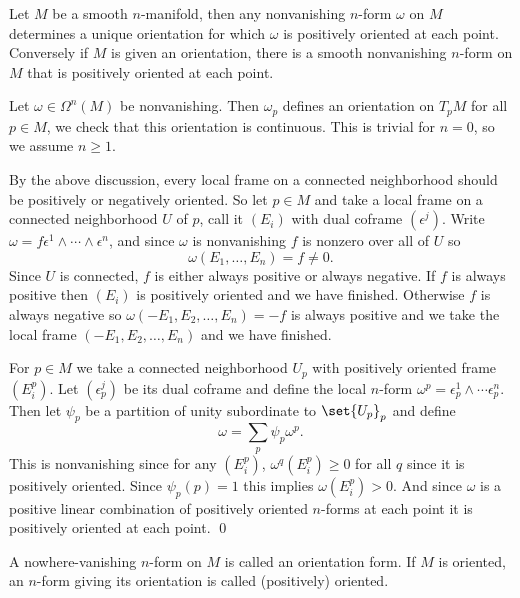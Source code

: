 \bprop

    Let $M$ be a smooth $n$-manifold, then any nonvanishing $n$-form $\omega$ on $M$ determines a unique orientation for
    which $\omega$ is positively oriented at each point.
    Conversely if $M$ is given an orientation, there is a smooth nonvanishing $n$-form on $M$ that is positively oriented
    at each point.

\eprop

\bproof

    Let $\omega\in\Omega^n(M)$ be nonvanishing.
    Then $\omega_p$ defines an orientation on $T_pM$ for all $p\in M$, we check that this orientation is continuous.
    This is trivial for $n=0$, so we assume $n\geq1$.

    By the above discussion, every local frame on a connected neighborhood should be positively or negatively oriented.
    So let $p\in M$ and take a local frame on a connected neighborhood $U$ of $p$, call it $(E_i)$ with dual coframe
    $(\epsilon^j)$.
    Write $\omega=f\epsilon^1\wedge\cdots\wedge\epsilon^n$, and since $\omega$ is nonvanishing $f$ is nonzero over all of $U$
    so
    $$ \omega(E_1,\dots,E_n) = f \neq 0 . $$
    Since $U$ is connected, $f$ is either always positive or always negative.
    If $f$ is always positive then $(E_i)$ is positively oriented and we have finished.
    Otherwise $f$ is always negative so $\omega(-E_1,E_2,\dots,E_n)=-f$ is always positive and we take the local frame
    $(-E_1,E_2,\dots,E_n)$ and we have finished.

    For $p\in M$ we take a connected neighborhood $U_p$ with positively oriented frame $(E_i^p)$.
    Let $(\epsilon^j_p)$ be its dual coframe and define the local $n$-form $\omega^p=\epsilon^1_p\wedge\cdots\epsilon^n_p$.
    Then let $\psi_p$ be a partition of unity subordinate to $\set{U_p}_p$ and define
    $$ \omega = \sum_p\psi_p\omega^p . $$
    This is nonvanishing since for any $(E_i^p)$, $\omega^q(E_i^p)\geq0$ for all $q$ since it is positively oriented.
    Since $\psi_p(p)=1$ this implies $\omega(E_i^p)>0$.
    And since $\omega$ is a positive linear combination of positively oriented $n$-forms at each point it is positively
    oriented at each point.
    \qed

\eproof

\bdefn

    A nowhere-vanishing $n$-form on $M$ is called an {\emphcolor orientation form}.
    If $M$ is oriented, an $n$-form giving its orientation is called {\emphcolor (positively) oriented}.

